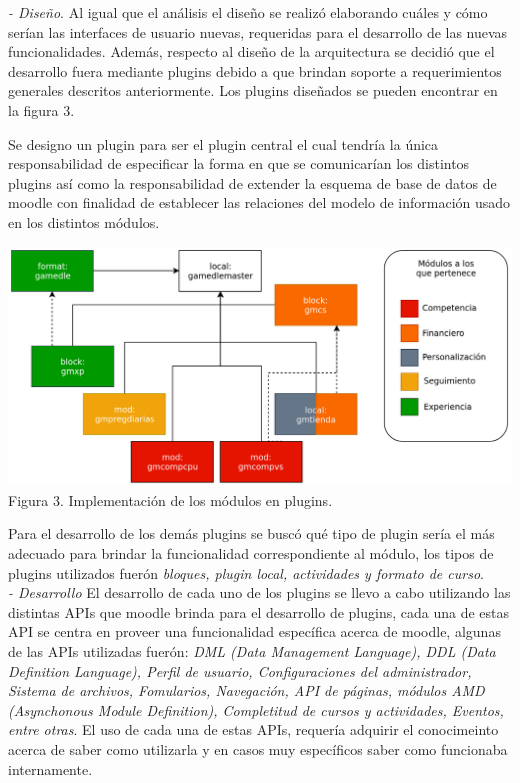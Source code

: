     {\it - Diseño}. Al igual que el análisis el diseño se realizó elaborando cuáles y
    cómo serían las interfaces de usuario nuevas, requeridas para el desarrollo de las
    nuevas funcionalidades. Además, respecto al diseño de la arquitectura se decidió
    que el desarrollo fuera mediante plugins debido a que brindan soporte a
    requerimientos generales descritos anteriormente. Los plugins diseñados se pueden
    encontrar en la figura 3.\par
%
    \noindent
    Se designo un plugin para ser el plugin central el cual tendría la única
    responsabilidad de especificar la forma en que se comunicarían los distintos
    plugins así como la responsabilidad de extender la esquema de base de datos de
    moodle con finalidad de establecer las relaciones del modelo de información usado
    en los distintos módulos.

        \begin{center}
        \includegraphics[width=1\linewidth]{images/plugins}
        \small Figura 3. Implementación de los módulos en plugins.
        \end{center}

    \noindent 
    Para el desarrollo de los demás plugins se buscó qué tipo de plugin sería el más
    adecuado para brindar la funcionalidad correspondiente al módulo, los tipos de
    plugins utilizados fuerón {\it bloques, plugin local, actividades y formato
    de curso}.\\

    {\it - Desarrollo} El desarrollo de cada uno de los plugins se llevo a cabo
    utilizando las distintas APIs que moodle brinda para el desarrollo de plugins, 
    cada una de estas API se centra en proveer una funcionalidad específica acerca
    de moodle, algunas de las APIs utilizadas fuerón: {\it DML (Data Management
    Language), DDL (Data Definition Language), Perfil de usuario, Configuraciones del
    administrador, Sistema de archivos, Fomularios, Navegación, API de páginas,
    módulos AMD (Asynchonous Module Definition), Completitud de cursos y actividades, 
    Eventos, entre otras}. El uso de cada una de estas APIs, requería adquirir el
    conocimeinto acerca de saber como utilizarla y en casos muy específicos saber como
    funcionaba internamente.\\

